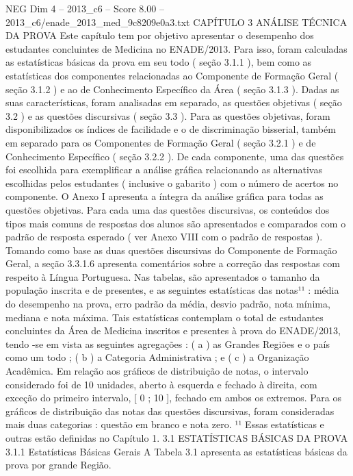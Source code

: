 \begin{textsample}{NEG Dim 4 – 2013\_c6 – Score 8.00 – 2013\_c6/enade\_2013\_med\_9c8209e0a3.txt}  \label{ex:f4_neg_310}
CAPÍTULO 3 ANÁLISE TÉCNICA DA PROVA Este capítulo tem por objetivo apresentar o desempenho dos estudantes concluintes de Medicina no ENADE/2013.
Para isso, foram calculadas as estatísticas básicas da prova em seu todo ( seção 3.1.1 ), bem como as estatísticas dos componentes relacionadas ao Componente de Formação Geral ( seção 3.1.2 ) e ao de Conhecimento Específico da Área ( seção 3.1.3 ).
Dadas as suas características, foram analisadas em separado, as questões objetivas ( seção 3.2 ) e as questões discursivas ( seção 3.3 ).
Para as questões objetivas, foram disponibilizados os índices de facilidade e o de discriminação bisserial, também em separado para os Componentes de Formação Geral ( seção 3.2.1 ) e de Conhecimento Específico ( seção 3.2.2 ).
De cada componente, uma das questões foi escolhida para exemplificar a análise gráfica relacionando as alternativas escolhidas pelos estudantes ( inclusive o gabarito ) com o número de acertos no componente.
O Anexo I apresenta a íntegra da análise gráfica para todas as questões objetivas.
Para cada uma das questões discursivas, os conteúdos dos tipos mais comuns de respostas dos alunos são apresentados e comparados com o padrão de resposta esperado ( ver Anexo VIII com o padrão de respostas ).
Tomando como base as duas questões discursivas do Componente de Formação Geral, a seção 3.3.1.6 apresenta comentários sobre a correção das respostas com respeito à Língua Portuguesa.
Nas tabelas, são apresentados o tamanho da população inscrita e de presentes, e as seguintes estatísticas das notas¹¹ : média do desempenho na prova, erro padrão da média, desvio padrão, nota mínima, mediana e nota máxima.
Tais estatísticas contemplam o total de estudantes concluintes da Área de Medicina inscritos e presentes à prova do ENADE/2013, tendo -se em vista as seguintes agregações : ( a ) as Grandes Regiões e o país como um todo ; ( b ) a Categoria Administrativa ; e ( c ) a Organização Acadêmica.
Em relação aos gráficos de distribuição de notas, o intervalo considerado foi de 10 unidades, aberto à esquerda e fechado à direita, com exceção do primeiro intervalo, [ 0 ; 10 ], fechado em ambos os extremos.
Para os gráficos de distribuição das notas das questões discursivas, foram consideradas mais duas categorias : questão em branco e nota zero. ¹¹ Essas estatísticas e outras estão definidas no Capítulo 1. 3.1 ESTATÍSTICAS BÁSICAS DA PROVA 3.1.1 Estatísticas Básicas Gerais A Tabela 3.1 apresenta as estatísticas básicas da prova por grande Região.

\end{textsample}
